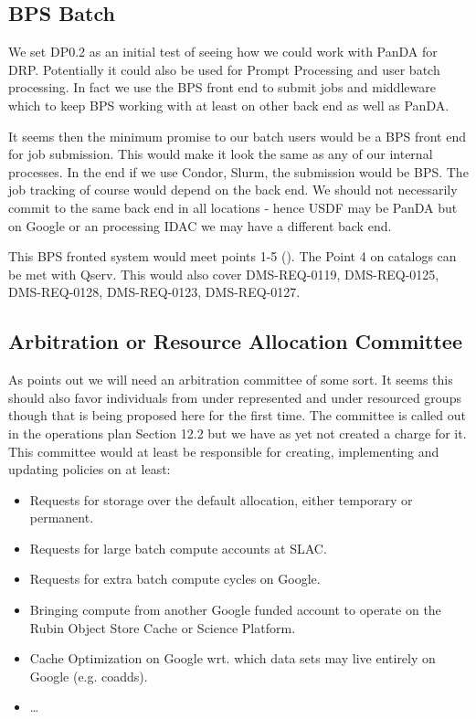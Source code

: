 \subsection{BPS Batch }\label{sec:bpsbatch}
We set DP0.2 as an initial test of seeing how we could work with PanDA 
for DRP. Potentially it could also be used for Prompt Processing and user batch processing.
In fact we use the BPS front end to submit jobs and middleware which to keep BPS working with at least on other back end as well as PanDA.

It seems then the minimum promise to our batch users would be a BPS front end for job submission.
This would make it look the same as any of our internal processes.
In the end if we use Condor, Slurm, the submission would be BPS.
The job tracking of course would depend on the back end.
We should not necessarily commit to the same back end in all locations - hence USDF may be PanDA but on Google or an processing IDAC we may have a different back end.

This BPS fronted system would meet  points 1-5 (). The Point 4 on catalogs can be met with Qserv.
This would also cover DMS-REQ-0119, DMS-REQ-0125, DMS-REQ-0128, DMS-REQ-0123, DMS-REQ-0127.


\subsection{Arbitration or Resource Allocation Committee}\label{sec:arbitration}
As  points out we will need an arbitration committee of some sort.
It seems this should also favor individuals from under represented  and under resourced groups though that is being proposed here for the first time.
The committee is called out in the operations plan  Section 12.2 but we have as yet not created a charge for it.
This committee would at least be responsible for creating, implementing and updating  policies on at least:

\begin{itemize}
\item Requests for storage over the default allocation, either temporary or permanent.
\item Requests for large batch compute accounts at SLAC.
\item Requests for extra batch compute cycles on Google.
\item Bringing compute from another Google funded account to operate on the Rubin Object Store Cache or Science Platform.
\item Cache Optimization on Google wrt. which data sets may live entirely on Google (e.g. coadds).
\item \ldots
\end{itemize}

